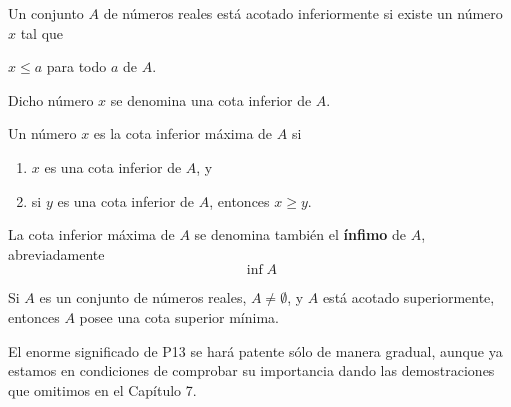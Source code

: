     \begin{def.}
	Un conjunto $A$ de números reales está acotado inferiormente si existe un número $x$ tal que
	\begin{center}
	    $x\leq a$ para todo $a$ de $A$.
	\end{center}
	Dicho número $x$ se denomina una cota inferior de $A$.
    \end{def.}

    \begin{def.}
	Un número $x$ es la cota inferior máxima de $A$ si
	\begin{enumerate}[\bfseries (1)]
	    \item $x$ es una cota inferior de $A$, y
	    \item si $y$ es una cota inferior de $A$, entonces $x\geq y$.
	\end{enumerate}
	La cota inferior máxima de $A$ se denomina también el \textbf{ínfimo} de $A$, abreviadamente
	$$\inf A$$
    \end{def.}

\begin{prop}
    Si $A$ es un conjunto de números reales, $A\neq \emptyset$, y $A$ está acotado superiormente, entonces $A$ posee una cota superior mínima. 
\end{prop}

El enorme significado de P13 se hará patente sólo de manera gradual, aunque ya estamos en condiciones de comprobar su importancia dando las demostraciones que omitimos en el Capítulo 7.\\


